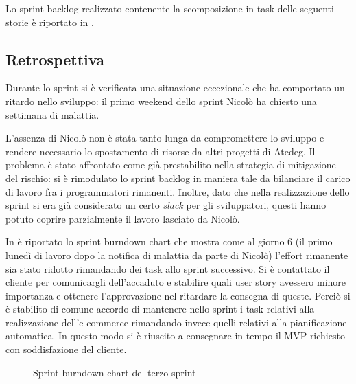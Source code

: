 Lo sprint backlog realizzato contenente la scomposizione in task delle seguenti storie è riportato in .

\subsection{Retrospettiva}
Durante lo sprint si è verificata una situazione eccezionale che ha comportato un ritardo nello sviluppo:
il primo weekend dello sprint Nicolò ha chiesto una settimana di malattia.

L'assenza di Nicolò non è stata tanto lunga da compromettere lo sviluppo e rendere necessario lo spostamento di risorse da altri progetti di Atedeg.
Il problema è stato affrontato come già prestabilito nella strategia di mitigazione del rischio: si è rimodulato lo sprint backlog in maniera tale da bilanciare il carico di lavoro fra i programmatori rimanenti. Inoltre, dato che nella realizzazione dello sprint si era già considerato un certo \emph{slack} per gli sviluppatori, questi hanno potuto coprire parzialmente il lavoro lasciato da Nicolò.

In  è riportato lo sprint burndown chart che mostra come al giorno 6 (il primo lunedì di lavoro dopo la notifica di malattia da parte di Nicolò) l'effort rimanente sia stato ridotto rimandando dei task allo sprint successivo.
Si è contattato il cliente per comunicargli dell'accaduto e stabilire quali user story avessero minore importanza e ottenere l'approvazione nel ritardare la consegna di queste. Perciò si è stabilito di comune accordo di mantenere nello sprint i task relativi alla realizzazione dell'e-commerce rimandando invece quelli relativi alla pianificazione automatica.
In questo modo si è riuscito a consegnare in tempo il MVP richiesto con soddisfazione del cliente.

\begin{figure}[htp]
  \centering
  \caption{Sprint burndown chart del terzo sprint}
  \label{fig:burndown-sprint-3}
\end{figure}



